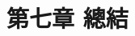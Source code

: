 \chapter{第七章 \quad 總結}
\renewcommand{\baselinestretch}{10} %
\par
\renewcommand{\baselinestretch}{1} %
\twelve \qquad 
\par
